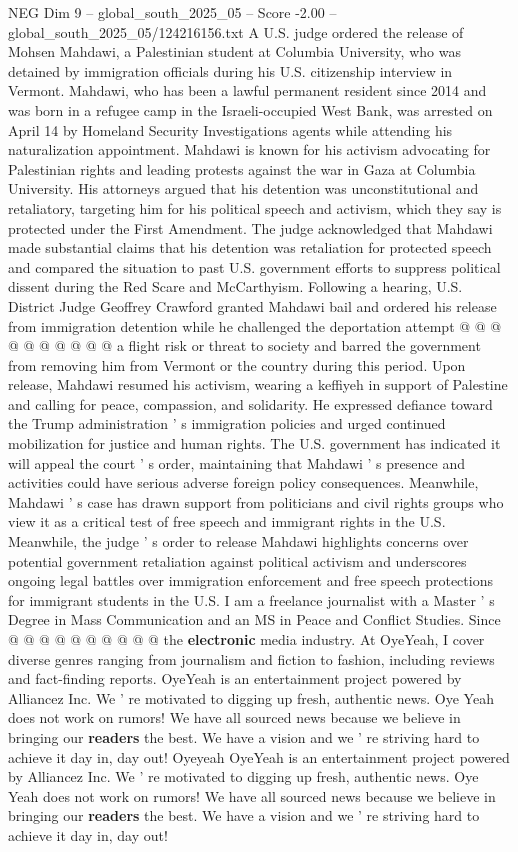 \begin{textsample}{NEG Dim 9 – global\_south\_2025\_05 – Score -2.00 – global\_south\_2025\_05/124216156.txt}  \label{ex:f9_neg_250}
A U.S. judge ordered the release of Mohsen Mahdawi, a Palestinian student at Columbia University, who was detained by immigration officials during his U.S. citizenship interview in Vermont.
Mahdawi, who has been a lawful permanent resident since 2014 and was born in a refugee camp in the Israeli-occupied West Bank, was arrested on April 14 by Homeland Security Investigations agents while attending his naturalization appointment.
Mahdawi is known for his activism advocating for Palestinian rights and leading protests against the war in Gaza at Columbia University.
His attorneys argued that his detention was unconstitutional and retaliatory, targeting him for his political speech and activism, which they say is protected under the First Amendment.
The judge acknowledged that Mahdawi made substantial claims that his detention was retaliation for protected speech and compared the situation to past U.S. government efforts to suppress political dissent during the Red Scare and McCarthyism.
Following a hearing, U.S.
District Judge Geoffrey Crawford granted Mahdawi bail and ordered his release from immigration detention while he challenged the deportation attempt @ @ @ @ @ @ @ @ @ @ a flight risk or threat to society and barred the government from removing him from Vermont or the country during this period.
Upon release, Mahdawi resumed his activism, wearing a keffiyeh in support of Palestine and calling for peace, compassion, and solidarity.
He expressed defiance toward the Trump administration ' s immigration policies and urged continued mobilization for justice and human rights.
The U.S. government has indicated it will appeal the court ' s order, maintaining that Mahdawi ' s presence and activities could have serious adverse foreign policy consequences.
Meanwhile, Mahdawi ' s case has drawn support from politicians and civil rights groups who view it as a critical test of free speech and immigrant rights in the U.S.
Meanwhile, the judge ' s order to release Mahdawi highlights concerns over potential government retaliation against political activism and underscores ongoing legal battles over immigration enforcement and free speech protections for immigrant students in the U.S.
I am a freelance journalist with a Master ' s Degree in Mass Communication and an MS in Peace and Conflict Studies.
Since @ @ @ @ @ @ @ @ @ @ the \textbf{electronic} media industry.
At OyeYeah, I cover diverse genres ranging from journalism and fiction to fashion, including reviews and fact-finding reports.
OyeYeah is an entertainment project powered by Alliancez Inc.
We ' re motivated to digging up fresh, authentic news.
Oye Yeah does not work on rumors!
We have all sourced news because we believe in bringing our \textbf{readers} the best.
We have a vision and we ' re striving hard to achieve it day in, day out!
Oyeyeah OyeYeah is an entertainment project powered by Alliancez Inc.
We ' re motivated to digging up fresh, authentic news.
Oye Yeah does not work on rumors!
We have all sourced news because we believe in bringing our \textbf{readers} the best.
We have a vision and we ' re striving hard to achieve it day in, day out!

\end{textsample}
